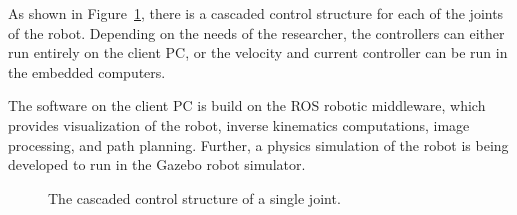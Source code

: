 \documentclass[a4paper, 11 pt, conference]{IEEEtran}  %
\begin{document}
As shown in Figure~\ref{fig:control_structure}, there is a cascaded control structure for each of the joints of the robot. Depending on the needs of the researcher, the controllers can either run entirely on the client PC, or the velocity and current controller can be run in the embedded computers.

The software on the client PC is build on the ROS robotic middleware, which provides visualization of the robot, inverse kinematics computations, image processing, and path planning.
Further, a physics simulation of the robot is being developed to run in the Gazebo robot simulator.

\begin{figure}
  
  \caption{The cascaded control structure of a single joint.}
  \label{fig:control_structure}
\end{figure}



\end{document}
